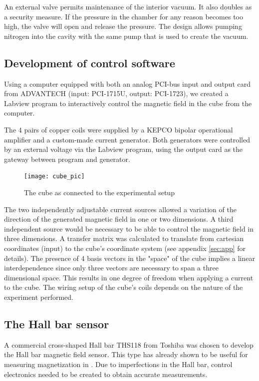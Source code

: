 \documentclass[journal]{IEEEtran}
\begin{document}
An external valve permits maintenance of the interior vacuum. It also doubles as a security measure. If the pressure in the chamber for any reason becomes too high, the valve will open and release the pressure. The design allows pumping nitrogen into the cavity with the same pump that is used to create the vacuum.

\subsection{Development of control software}

Using a computer equipped with both an analog PCI-bus input and output card from ADVANTECH (input: PCI-1715U, output: PCI-1723), we created a Labview program to interactively control the magnetic field in the cube from the computer.

The 4 pairs of copper coils were supplied by a KEPCO bipolar operational amplifier and a custom-made current generator. Both generators were controlled by an external voltage via the Labview program, using the output card as the gateway between program and generator.

\begin{figure}[H]
\centering
\texttt{[image: cube\_pic]}
\caption{The cube as connected to the experimental setup}
\end{figure}

The two independently adjustable current sources allowed a variation of the direction of the generated magnetic field in one or two dimensions. A third independent source would be necessary to be able to control the magnetic field in three dimensions. A transfer matrix was calculated to translate from cartesian coordinates (input) to the cube's coordinate system (see appendix \ref{sec:app} for details). The presence of 4 basis vectors in the "space" of the cube implies a linear interdependence  since only three vectors are necessary to span a three dimensional space. This results in one degree of freedom when applying a current to the cube.  The wiring setup of the cube's coils depends on the nature of the experiment performed.
 

\subsection{The Hall bar sensor}
A commercial cross-shaped Hall bar THS118 from Toshiba was chosen to develop the Hall bar magnetic field sensor. This type has already shown to be useful for measuring magnetization in \cite{nishioka}. Due to imperfections in the Hall bar, control electronics needed to be created to obtain accurate measurements. 
\end{document}
